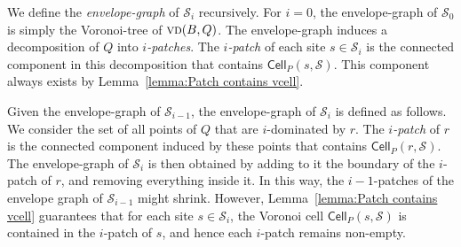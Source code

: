 \documentclass[a4paper,UKenglish]{socg-lipics-v2018}
\newcommand{\icell}[1][i]{${#1}$-patch\xspace}
\newcommand{\icells}[1][i]{${#1}$-patches\xspace}
\newcommand{\s}{\mathcal S}
\newcommand{\cell}[2][P]{\ensuremath{\mathsf{Cell}_{\scriptscriptstyle #1}(#2)}}
\newcommand{\vd}[2][P]{\textsc{vd}(#2, #1)}
\begin{document}
We define the \emph{envelope-graph} of $\s_i$ recursively. For $i = 0$, the envelope-graph of $\s_0$ is simply the Voronoi-tree of $\vd[Q]{B}$.
The envelope-graph induces a decomposition of $Q$ into \emph{\icells}.
The \emph{\icell} of each site $s\in \s_i$ is the connected component in this decomposition that contains $\cell{s, \s}$.
This component always exists by Lemma~\ref{lemma:Patch contains vcell}.

Given the envelope-graph of $\s_{i-1}$, the envelope-graph of $\s_i$ is defined as follows.
We consider the set of all points of $Q$ that are $i$-dominated by $r$. 
The \emph{\icell} of $r$ is the connected component induced by these points that contains $\cell{r, \s}$.
The envelope-graph of $\s_i$ is then obtained by adding to it the boundary of the \icell of $r$, and removing everything inside it. 
In this way, the \icells[i-1] of the envelope graph of $\s_{i-1}$ might shrink. 
However, Lemma~\ref{lemma:Patch contains vcell} guarantees that for each site $s\in \s_i$, the Voronoi cell $\cell{s, \s}$ is contained in the \icell of $s$, and hence each \icell remains non-empty.
\end{document}
